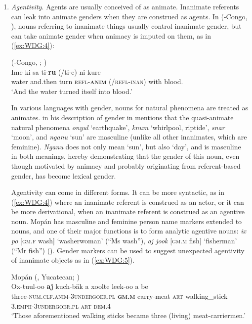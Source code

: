 \documentclass[output=collectionpaper]{langsci/langscibook}
\begin{document}
\begin{enumerate}[label=(\roman*)]
\item \textit{Agentivity}. Agents are usually conceived of as animate. Inanimate referents can leak into animate genders when they are construed as agents. In  (-Congo, ), nouns referring to inanimate things usually control inanimate gender, but can take animate gender when animacy is imputed on them, as in (\ref{ex:WDG:4}):

\ea\label{ex:WDG:4}
 (-Congo, ; \citealt[32]{Gore1926})\\
\gll Ime	ki	sa	ti-\textbf{ru}	(/ti-e)	ni	kure\\
 water	and.then	turn	\textsc{refl-\textbf{anim}}	(/\textsc{refl-inan})	with	blood.\\
\glt `And the water turned itself into blood.'\\
\z

In various languages with gender, nouns for natural phenomena are treated as animates.  in his description of gender in  mentions that the quasi-animate natural phenomena \textit{onyul} `earthquake', \textit{knum} `whirlpool, riptide', \textit{snar} `moon', and \textit{nganu} `sun' are masculine (unlike all other inanimates, which are feminine). \textit{Nganu} does not only mean `sun', but also `day', and is masculine in both meanings, hereby demonstrating that the gender of this noun, even though motivated by animacy and probably originating from referent-based gender, has become lexical gender.

Agentivity can come in different forms. It can be more syntactic, as in (\ref{ex:WDG:4}) where an inanimate referent is construed as an actor, or it can be more derivational, when an inanimate referent is construed as an agentive noun. Mopán  has masculine and feminine person name markers extended to nouns, and one of their major functions is to form analytic agentive nouns: \textit{ix p\textquotesingle{}o\textquotesingle{}} [\textsc{gm.f} wash] `washerwoman' (``Ms wash''), \textit{aj jook\textquotesingle{}} [\textsc{gm.m} fish] `fisherman' (``Mr fish'') (\citealt[140]{Contini-Morava2018}). Gender markers can be used to suggest unexpected agentivity of inanimate objects as in (\ref{ex:WDG:5}).

\ea\label{ex:WDG:5}
Mopán  (, Yucatecan; \citealt[141]{Contini-Morava2018})\\
\gll Ox-tuul-oo\textquotesingle{}	\textbf{aj}	kuch-b\textquotesingle{}äk\textquotesingle{} a	xoolte\textquotesingle{}	leek-oo\textquotesingle{}	a	b\textquotesingle{}e\textquotesingle{}\\
three-\textsc{num.clf.anim-3undergoer.pl}	\textbf{\textsc{gm.m}}	carry-meat \textsc{art}	walking\_stick	\textsc{3.emph-3undergoer.pl}	\textsc{art}	\textsc{dem.4}\\
\glt `Those aforementioned walking sticks became three (living) meat-carriermen.'\\
\z


\end{enumerate}
\end{document}
